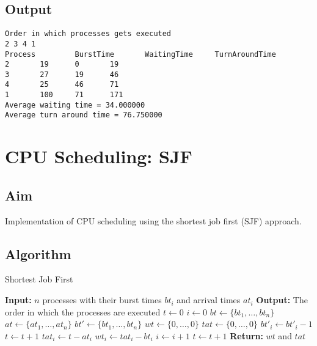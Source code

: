 \inputminted[fontsize=\footnotesize,autogobble]{c}{code/priority.c}

\subsection{Output}
\begin{lstlisting}[style=output]
Order in which processes gets executed
2 3 4 1 
Process         BurstTime       WaitingTime     TurnAroundTime
2		19		0		19
3		27		19		46
4		25		46		71
1		100		71		171
Average waiting time = 34.000000
Average turn around time = 76.750000
\end{lstlisting}

\pagebreak
\section{CPU Scheduling: SJF}

\subsection{Aim}
Implementation of CPU scheduling using the shortest job first (SJF) approach.

\subsection{Algorithm}

\begin{algorithm}
	\caption{Shortest Job First}
	\label{alg:sjf}
	\begin{algorithmic}
		\State \textbf{Input:} $n$ processes with their burst times $bt_i$ and arrival times $at_i$
		\State \textbf{Output:} The order in which the processes are executed
		\State $t \gets 0$ 
		\State $i \gets 0$ 
		\State $bt \gets \{bt_1, \dots, bt_n\}$ 
		\State $at \gets \{at_1, \dots, at_n\}$ 
		\State $bt' \gets \{bt_1, \dots, bt_n\}$ 
		\State $wt \gets \{0, \dots, 0\}$ 
		\State $tat \gets \{0, \dots, 0\}$ 
			 
				\State $bt'_i \gets bt'_i - 1$
				\State $t \gets t + 1$
					\State $tat_i \gets t - at_i$
					\State $wt_i \gets tat_i - bt_i$
					\State $i \gets i + 1$
				\EndIf
				\Else
					\State $t \gets t + 1$
			\EndIf
		\EndWhile
		\State \textbf{Return:} $wt$ and $tat$
	\end{algorithmic}
\end{algorithm}

